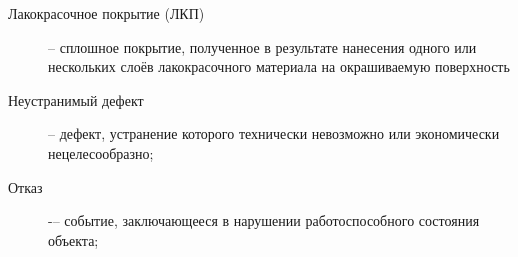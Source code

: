 \begin{description}
	\item
	[Лакокрасочное покрытие (ЛКП)] -- сплошное покрытие, полученное в результате нанесения 	одного или нескольких слоёв лакокрасочного материала на окрашиваемую поверхность
	\item
	[Неустранимый дефект] -- дефект, устранение которого технически невозможно или экономически нецелесообразно;
	\item
	[Отказ]  -–  событие, заключающееся в нарушении работоспособного состояния объекта;
	

\end{description}
